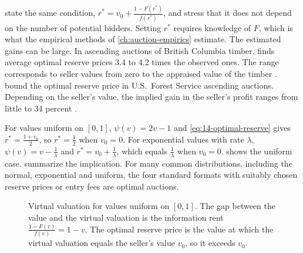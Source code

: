  state the same condition, $r^*=v_0+\frac{1-F(r^*)}{f(r^*)}$, and stress that it does not depend on the number of potential bidders. Setting $r^*$ requires knowledge of $F$, which is what the empirical methods of \cref{ch:auction-empirics} estimate. The estimated gains can be large. In ascending auctions of British Columbia timber, \citet{Paarsch1997} finds average optimal reserve prices 3.4 to 4.2 times the observed ones. The range corresponds to seller values from zero to the appraised value of the timber \citep[p.~88]{HortacsuPerrigne2021}.  bound the optimal reserve price in U.S.\ Forest Service ascending auctions. Depending on the seller's value, the implied gain in the seller's profit ranges from little to 34 percent \citep[p.~88]{HortacsuPerrigne2021}.

For values uniform on $[0,1]$, $\psi(v)=2v-1$ and \eqref{eq:14-optimal-reserve} gives $r^*=\frac{1+v_0}{2}$, so $r^*=\frac12$ when $v_0=0$. For exponential values with rate $\lambda$, $\psi(v)=v-\frac{1}{\lambda}$ and $r^*=v_0+\frac{1}{\lambda}$, which equals $\frac{1}{\lambda}$ when $v_0=0$.  shows the uniform case.  summarize the implication. For many common distributions, including the normal, exponential and uniform, the four standard formats with suitably chosen reserve prices or entry fees are optimal auctions.

\begin{figure}[htbp]
\centering
{}
\caption{Virtual valuation for values uniform on $[0,1]$. The gap between the value and the virtual valuation is the information rent $\frac{1-F(v)}{f(v)}=1-v$. The optimal reserve price is the value at which the virtual valuation equals the seller's value $v_0$, so it exceeds $v_0$.}\label{fig:14-virtual}
\end{figure}

